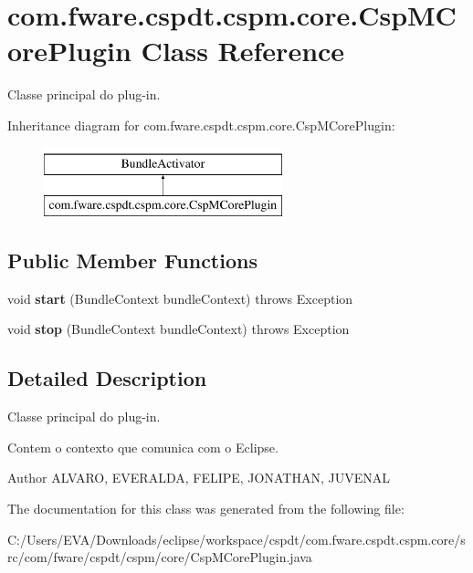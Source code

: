 \hypertarget{classcom_1_1fware_1_1cspdt_1_1cspm_1_1core_1_1_csp_m_core_plugin}{}\section{com.\+fware.\+cspdt.\+cspm.\+core.\+Csp\+M\+Core\+Plugin Class Reference}
\label{classcom_1_1fware_1_1cspdt_1_1cspm_1_1core_1_1_csp_m_core_plugin}


Classe principal do plug-\/in.  


Inheritance diagram for com.\+fware.\+cspdt.\+cspm.\+core.\+Csp\+M\+Core\+Plugin\+:\begin{figure}[H]
\begin{center}
\leavevmode
\includegraphics[height=2.000000cm]{classcom_1_1fware_1_1cspdt_1_1cspm_1_1core_1_1_csp_m_core_plugin}
\end{center}
\end{figure}
\subsection*{Public Member Functions}
\begin{DoxyCompactItemize}
\item 
\mbox{\label{classcom_1_1fware_1_1cspdt_1_1cspm_1_1core_1_1_csp_m_core_plugin_a1d041e63450748ffe936d4e41b3de5aa}} 
void {\bfseries start} (Bundle\+Context bundle\+Context)  throws Exception 
\item 
\mbox{\label{classcom_1_1fware_1_1cspdt_1_1cspm_1_1core_1_1_csp_m_core_plugin_aa11fe9ba973ee978252af28e5e16b605}} 
void {\bfseries stop} (Bundle\+Context bundle\+Context)  throws Exception 
\end{DoxyCompactItemize}


\subsection{Detailed Description}
Classe principal do plug-\/in. 

Contem o contexto que comunica com o Eclipse.

\begin{DoxyAuthor}{Author}
A\+L\+V\+A\+RO, E\+V\+E\+R\+A\+L\+DA, F\+E\+L\+I\+PE, J\+O\+N\+A\+T\+H\+AN, J\+U\+V\+E\+N\+AL 
\end{DoxyAuthor}


The documentation for this class was generated from the following file\+:\begin{DoxyCompactItemize}
\item 
C\+:/\+Users/\+E\+V\+A/\+Downloads/eclipse/workspace/cspdt/com.\+fware.\+cspdt.\+cspm.\+core/src/com/fware/cspdt/cspm/core/Csp\+M\+Core\+Plugin.\+java\end{DoxyCompactItemize}
